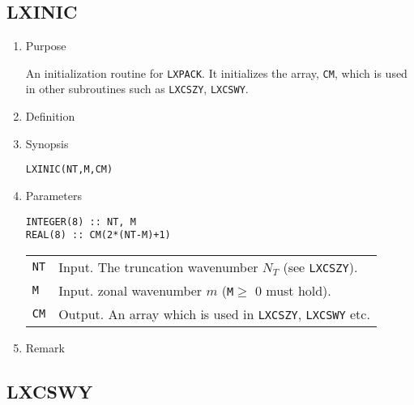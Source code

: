 \documentclass[a4paper]{scrartcl}
\begin{document}
\subsection{LXINIC}

\begin{enumerate}

\item Purpose  

An initialization routine for \texttt{LXPACK}.  
It initializes the array, \texttt{CM},
which is used in other subroutines such as \texttt{LXCSZY}, \texttt{LXCSWY}.
  
\item Definition

\item Synopsis 
  
    
\texttt{LXINIC(NT,M,CM)}
  
\item Parameters

\begin{verbatim}
INTEGER(8) :: NT, M
REAL(8) :: CM(2*(NT-M)+1)
\end{verbatim}
      
\begin{tabular}{ll}
\texttt{NT} & Input. The truncation wavenumber $N_T$
  (see \texttt{LXCSZY}).\\
\texttt{M} & Input. zonal wavenumber $m$ 
(\texttt{M}$\ge$ 0 must hold).\\
\texttt{CM}  & Output. An array which is used in \texttt{LXCSZY},
\texttt{LXCSWY} etc.
\end{tabular}

\item Remark

\end{enumerate}

\subsection{LXCSWY}
\end{document}
